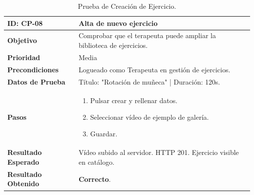 \begin{table}[H]
    \centering
    \begin{tabularx}{\textwidth}{|l|X|}
        \hline
        \rowcolor{gray!25} \textbf{ID: CP-08} & \textbf{Alta de nuevo ejercicio} \\ \hline
        \textbf{Objetivo} & Comprobar que el terapeuta puede ampliar la biblioteca de ejercicios. \\ \hline
        \textbf{Prioridad} & Media \\ \hline
        \textbf{Precondiciones} & Logueado como Terapeuta en gestión de ejercicios. \\ \hline
        \textbf{Datos de Prueba} & Título: "Rotación de muñeca" | Duración: 120s. \\ \hline
        \textbf{Pasos} & 
        \vspace*{-\baselineskip}
        \begin{enumerate}
            \item Pulsar crear y rellenar datos.
            \item Seleccionar vídeo de ejemplo de galería.
            \item Guardar.
        \end{enumerate} \\ \hline
        \textbf{Resultado Esperado} & Vídeo subido al servidor. HTTP 201. Ejercicio visible en catálogo. \\ \hline
        \textbf{Resultado Obtenido} & \textcolor{green!40!black}{\textbf{Correcto}}. \\ \hline
    \end{tabularx}
    \caption{Prueba de Creación de Ejercicio.}
\end{table}

